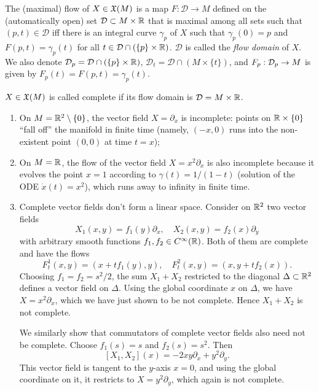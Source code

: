 \begin{defn}[Flow]
The (maximal) flow of $X\in\mathfrak{X}(M)$ is a map $F:\mathcal{D}\to M$ defined on the (automatically open) set $\mathcal{D}\subset M\times \mathbb{R} $ that is maximal among all sets such that $(p,t)\in \mathcal{D}$ iff there is an integral curve $\gamma_p$ of $X$ such that $\gamma_p(0)=p$ and $F(p,t)=\gamma_p(t)$ for all $t\in\mathcal{D}\cap (\{p\}\times\mathbb{R} )$. $\mathcal{D}$ is called the \emph{flow domain} of $X$. We also denote $\mathcal{D}_p=\mathcal{D}\cap (\{p\}\times\mathbb{R} )$, $\mathcal{D}_t=\mathcal{D}\cap (M\times\{t\})$, and $F_p:\mathcal{D}_p\to M$ is given by $F_p(t)=F(p,t)=\gamma_p(t)$.
\end{defn}



\begin{defn}
$X\in\mathfrak{X}(M)$ is called complete if its flow domain is $\mathcal{D}=M\times\mathbb{R} $. 
\end{defn}
\begin{example}
\begin{enumerate}
    \item On $M=\mathbb{R}^2\setminus\{0\}$, the vector field $X=\partial_x$ is incomplete: points on $\mathbb{R} \times\{0\}$ ``fall off'' the manifold in finite time (namely, $(-x,0)$ runs into the non-existent point $(0,0)$ at time $t=x$);
    \item On $M=\mathbb{R} $, the flow of the vector field $X=x^2\partial_x$ is also incomplete because it evolves the point $x=1$ according to $\gamma(t)=1/(1-t)$ (solution of the ODE $\dot x(t)=x^2$), which runs away to infinity in finite time.
    \item Complete vector fields don't form a linear space. Consider on $\mathbb{R}^2$ two vector fields
    \[X_1(x,y)=f_1(y)\partial_x, \quad X_2(x,y)=f_2(x)\partial_y\]
    with arbitrary smooth functions $f_1,f_2\in C^\infty(\mathbb{R})$. Both of them are complete and have the flows
    \[F^1_t(x,y)=(x+tf_1(y),y),\quad F^2_t(x,y)=(x,y+tf_2(x)).\]
    Choosing $f_1=f_2=s^2/2$, the sum $X_1+X_2$ restricted to the diagonal $\Delta\subset \mathbb{R}^2$ defines a vector field on $\Delta$. Using the global coordinate $x$ on $\Delta$, we have $X=x^2\partial_x$, which we have just shown to be not complete. Hence $X_1+X_2$ is not complete.

    We similarly show that commutators of complete vector fields also need not be complete. Choose $f_1(s)=s$ and $f_2(s)=s^2$. Then
    \[[X_1,X_2](x)=-2xy\partial_x+y^2\partial_y.\]
    This vector field is tangent to the $y$-axis $x=0$, and using the global coordinate on it, it restricts to $X=y^2\partial_y$, which again is not complete.
\end{enumerate}
\end{example}


